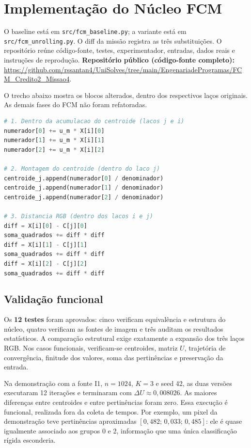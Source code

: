 \documentclass[11pt,a4paper]{article}
\begin{document}
\section{Implementação do Núcleo FCM}
O baseline está em \texttt{src/fcm\_baseline.py}; a variante está em
\texttt{src/fcm\_unrolling.py}. O diff da missão registra as três substituições.
O repositório reúne código-fonte, testes, experimentador, entradas, dados reais
e instruções de reprodução. \textbf{Repositório público (código-fonte completo):}\\\url{https://github.com/rssantan4/UniSolves/tree/main/EngenariadeProgramas/FCM_Credito2_Missao4}.

O trecho abaixo mostra os blocos alterados, dentro dos respectivos laços
originais. As demais fases do FCM não foram refatoradas.

\noindent\begin{minipage}{\linewidth}
\begin{lstlisting}[language=Python,caption={Operações RGB explícitas na variante.}]
# 1. Dentro da acumulacao do centroide (lacos j e i)
numerador[0] += u_m * X[i][0]
numerador[1] += u_m * X[i][1]
numerador[2] += u_m * X[i][2]

# 2. Montagem do centroide (dentro do laco j)
centroide_j.append(numerador[0] / denominador)
centroide_j.append(numerador[1] / denominador)
centroide_j.append(numerador[2] / denominador)

# 3. Distancia RGB (dentro dos lacos i e j)
diff = X[i][0] - C[j][0]
soma_quadrados += diff * diff
diff = X[i][1] - C[j][1]
soma_quadrados += diff * diff
diff = X[i][2] - C[j][2]
soma_quadrados += diff * diff
\end{lstlisting}
\end{minipage}

\subsection{Validação funcional}
Os \textbf{12 testes} foram aprovados: cinco verificam equivalência e estrutura
do núcleo, quatro verificam as fontes de imagem e três auditam os resultados
estatísticos. A comparação estrutural exige exatamente a expansão dos três
laços RGB. Nos casos funcionais, verificam-se centroides, matriz $U$,
trajetória de convergência, finitude dos valores, soma das pertinências e
preservação da entrada.

Na demonstração com a fonte I1, $n=1024$, $K=3$ e seed 42, as duas versões
executaram 12 iterações e terminaram com $\Delta U\approx0{,}008026$.
As maiores diferenças entre centroides e entre pertinências foram zero.
Essa execução é funcional, realizada fora da coleta de tempos.
Por exemplo, um pixel da demonstração teve pertinências aproximadas
$[0{,}482;\,0{,}033;\,0{,}485]$: ele é quase igualmente associado aos grupos
0 e 2, informação que uma única classificação rígida esconderia.
\end{document}
